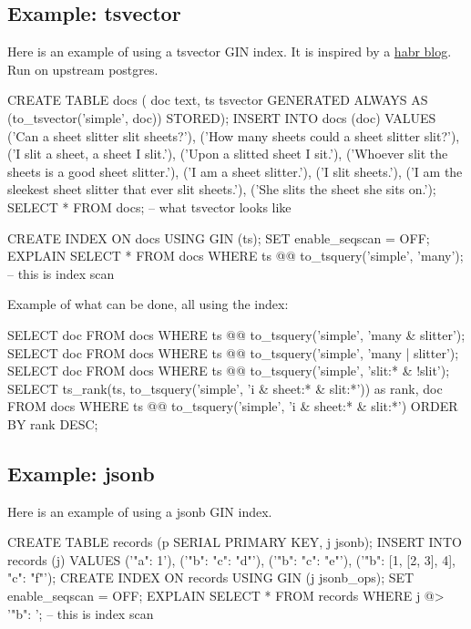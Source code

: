 \documentclass[11pt]{article}
\begin{document}
\hypertarget{example-tsvector}{%
\subsection{Example: tsvector}\label{example-tsvector}}

Here is an example of using a tsvector GIN index. It is inspired by a
\href{https://habr.com/en/company/postgrespro/blog/448746/}{habr blog}.  Run on
upstream postgres.

\begin{sqlcode}
CREATE TABLE docs (
    doc text,
    ts tsvector GENERATED ALWAYS AS (to_tsvector('simple', doc)) STORED);
INSERT INTO docs (doc) VALUES
  ('Can a sheet slitter slit sheets?'),
  ('How many sheets could a sheet slitter slit?'),
  ('I slit a sheet, a sheet I slit.'),
  ('Upon a slitted sheet I sit.'),
  ('Whoever slit the sheets is a good sheet slitter.'),
  ('I am a sheet slitter.'),
  ('I slit sheets.'),
  ('I am the sleekest sheet slitter that ever slit sheets.'),
  ('She slits the sheet she sits on.');
SELECT * FROM docs; -- what tsvector looks like
\end{sqlcode}

\begin{sqlcode}
CREATE INDEX ON docs USING GIN (ts);
SET enable_seqscan = OFF;
EXPLAIN SELECT * FROM docs
    WHERE ts @@ to_tsquery('simple', 'many'); -- this is index scan
\end{sqlcode}

Example of what can be done, all using the index:

\begin{sqlcode}
SELECT doc FROM docs WHERE ts @@ to_tsquery('simple', 'many & slitter');
SELECT doc FROM docs WHERE ts @@ to_tsquery('simple', 'many | slitter');
SELECT doc FROM docs WHERE ts @@ to_tsquery('simple', 'slit:* & !slit');
SELECT ts_rank(ts, to_tsquery('simple', 'i & sheet:* & slit:*')) as rank, doc
    FROM docs
    WHERE ts @@ to_tsquery('simple', 'i & sheet:* & slit:*')
    ORDER BY rank DESC;
\end{sqlcode}

\hypertarget{example-jsonb}{%
\subsection{Example: jsonb}\label{example-jsonb}}

Here is an example of using a jsonb GIN index.

\begin{sqlcode}
CREATE TABLE records (p SERIAL PRIMARY KEY, j jsonb);
INSERT INTO records (j) VALUES
  ('{"a": 1}'),
  ('{"b": {"c": "d"}}'),
  ('{"b": {"c": "e"}}'),
  ('{"b": [1, [2, 3], 4], "c": "f"}');
CREATE INDEX ON records USING GIN (j jsonb_ops);
SET enable_seqscan = OFF;
EXPLAIN SELECT * FROM records WHERE j @> '{"b": {}}'; -- this is index scan
\end{sqlcode}
\end{document}
